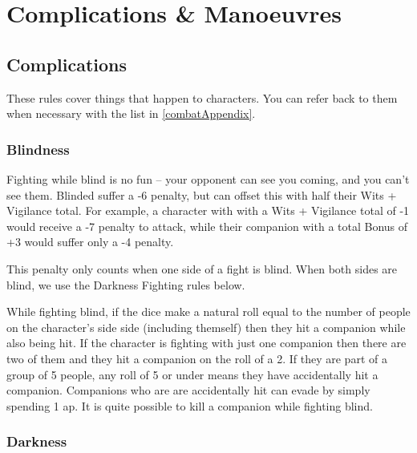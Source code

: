 \startcontents[Manoeuvres]

\section{Complications \& Manoeuvres}

\begin{multicols}{2}

\subsection{Complications}

These rules cover things that happen to characters.
You can refer back to them when necessary with the list in \autoref{combatAppendix}.

\subsubsection[Blindness: Roll at -6 penalty, + (Wits + Vigilance)/ 2]{Blindness}

Fighting while blind is no fun -- your opponent can see you coming, and you can't see them.
Blinded suffer a -6 penalty, but can offset this with half their Wits + Vigilance total.
For example, a character with with a Wits + Vigilance total of -1 would receive a -7 penalty to attack, while their companion with a total Bonus of +3 would suffer only a -4 penalty.

This penalty only counts when one side of a fight is blind. When both sides are blind, we use the Darkness Fighting rules below.

While fighting blind, if the dice make a \gls{natural} roll equal to the number of people on the character's side side (including themself) then they hit a companion while also being hit.
If the character is fighting with just one companion then there are two of them and they hit a companion on the roll of a 2.
If they are part of a group of 5 people, any roll of 5 or under means they have accidentally hit a companion.
Companions who are are accidentally hit can evade by simply spending 1 \gls{ap}.
It is quite possible to kill a companion while fighting blind.

\subsubsection[Darkness: Roll Bonus cannot exceed Wits + Vigilance]{Darkness}
\label{darkness}


\end{multicols}
